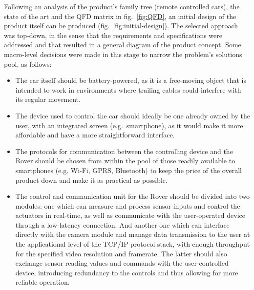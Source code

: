 %
Following an analysis of the product’s family tree (remote controlled cars), the state of the art and the QFD matrix in fig.~\ref{fig:QFD}, an initial design of the product itself can be produced (fig.~\ref{fig:initial-design}).
The selected approach was top-down, in the sense that the requirements and specifications were addressed and that resulted in a general diagram of the product concept. Some macro-level decisions were made in this stage to narrow the problem’s solutions pool, as follows:
\begin{itemize}
\item  The car itself should be battery-powered, as it is a free-moving object that is intended to work in environments where trailing cables could interfere with its regular movement.
\item The device used to control the car should ideally be one already owned by the user, with an integrated screen (e.g.~smartphone), as it would make it more affordable and have a more straightforward interface.
\item The protocols for communication between the controlling device and the Rover should be chosen from within the pool of those readily available to smartphones (e.g. Wi-Fi, GPRS, Bluetooth) to keep the price of the overall product down and make it as practical as possible.
\item  The control and communication unit for the Rover should be divided into two modules: one which can measure and process sensor inputs and control the actuators in real-time, as well as communicate with the user-operated device through a low-latency connection. And another one which can interface directly with the camera module and manage data transmission to the user at the applicational level of the TCP/IP protocol stack, with enough throughput for the specified video resolution and framerate. The latter should also exchange sensor reading values and commands with the user-controlled device, introducing redundancy to the controls and thus allowing for more reliable operation.
\end{itemize}

